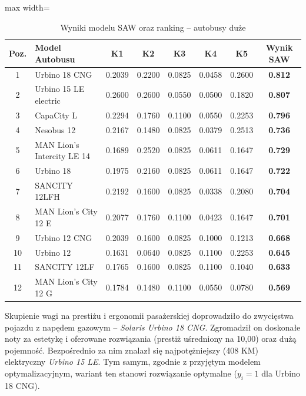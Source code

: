 \begin{table}[H]
    \centering
    \caption{Wyniki modelu SAW oraz ranking -- autobusy duże}
    \vspace{0.2cm}
    \begin{adjustbox}{max width=\textwidth}
    \begin{tabular}{|c|l|c|c|c|c|c|c|}
        \hline
        \textbf{Poz.} & \textbf{Model Autobusu} & \textbf{K1} & \textbf{K2} & \textbf{K3} & \textbf{K4} & \textbf{K5} & \textbf{Wynik SAW} \\ \hline
        1 & Urbino 18 CNG & 0.2039 & 0.2200 & 0.0825 & 0.0458 & 0.2600 & \textbf{0.812} \\ \hline
        2 & Urbino 15 LE electric & 0.2600 & 0.2600 & 0.0550 & 0.0500 & 0.1820 & \textbf{0.807} \\ \hline
        3 & CapaCity L & 0.2294 & 0.1760 & 0.1100 & 0.0550 & 0.2253 & \textbf{0.796} \\ \hline
        4 & Nesobus 12 & 0.2167 & 0.1480 & 0.0825 & 0.0379 & 0.2513 & \textbf{0.736} \\ \hline
        5 & MAN Lion's Intercity LE 14 & 0.1689 & 0.2520 & 0.0825 & 0.0611 & 0.1647 & \textbf{0.729} \\ \hline
        6 & Urbino 18 & 0.1975 & 0.2160 & 0.0825 & 0.0611 & 0.1647 & \textbf{0.722} \\ \hline
        7 & SANCITY 12LFH & 0.2192 & 0.1600 & 0.0825 & 0.0338 & 0.2080 & \textbf{0.704} \\ \hline
        8 & MAN Lion's City 12 E & 0.2077 & 0.1760 & 0.1100 & 0.0423 & 0.1647 & \textbf{0.701} \\ \hline
        9 & Urbino 12 CNG & 0.2039 & 0.1600 & 0.0825 & 0.1000 & 0.1213 & \textbf{0.668} \\ \hline
        10 & Urbino 12 & 0.1631 & 0.0640 & 0.0825 & 0.1100 & 0.2253 & \textbf{0.645} \\ \hline
        11 & SANCITY 12LF & 0.1765 & 0.1600 & 0.0825 & 0.1100 & 0.1040 & \textbf{0.633} \\ \hline
        12 & MAN Lion's City 12 G & 0.1784 & 0.1480 & 0.1100 & 0.0550 & 0.0780 & \textbf{0.569} \\ \hline
    \end{tabular}
    \end{adjustbox}
\end{table}

Skupienie wagi na prestiżu i ergonomii pasażerskiej doprowadziło do zwycięstwa pojazdu z napędem gazowym -- \textit{Solaris Urbino 18 CNG}. Zgromadził on doskonałe noty za estetykę i oferowane rozwiązania (prestiż uśredniony na 10,00) oraz dużą pojemność. Bezpośrednio za nim znalazł się najpotężniejszy (408 KM) elektryczny \textit{Urbino 15 LE}. Tym samym, zgodnie z przyjętym modelem optymalizacyjnym, wariant ten stanowi rozwiązanie optymalne ($y_i = 1$ dla Urbino 18 CNG).

